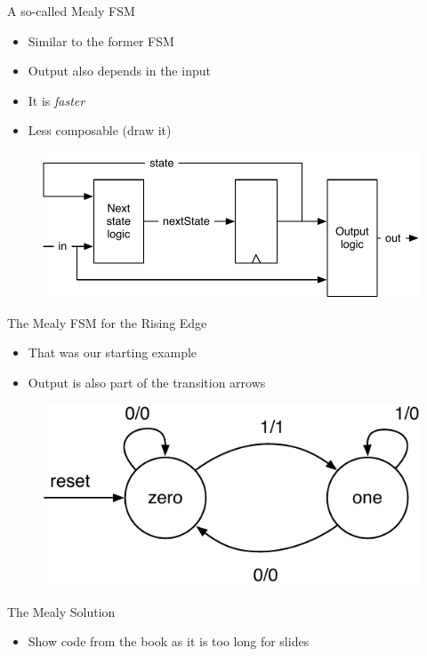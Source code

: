 \begin{frame}[fragile]{A so-called Mealy FSM}
\begin{itemize}
\item Similar to the former FSM
\item Output also depends in the input
\item It is \emph{faster}
\item Less composable (draw it)
\end{itemize}
\begin{figure}
  \includegraphics[scale=\scale]{../figures/mealy}
\end{figure}
\end{frame}

\begin{frame}[fragile]{The Mealy FSM for the Rising Edge}
\begin{itemize}
\item That was our starting example
\item Output is also part of the transition arrows
\end{itemize}
\begin{figure}
  \includegraphics[scale=\scale]{../figures/state-diag-mealy}
\end{figure}
\end{frame}

\begin{frame}[fragile]{The Mealy Solution}
\begin{itemize}
\item Show code from the book as it is too long for slides
\end{itemize}
\end{frame}

